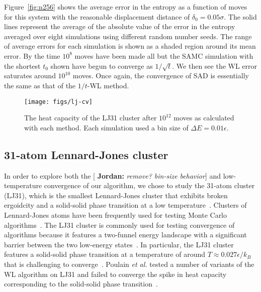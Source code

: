 \documentclass[letterpaper,twocolumn,amsmath,amssymb,pre,aps,10pt]{revtex4-1}
\newcommand{\blue}[1]{{\bf \color{blue} #1}}
\newcommand{\jpsays}[1]{{\color{red} [\blue{Jordan:} \emph{#1}]}}
\begin{document}
Figure~\ref{fig:n256} shows the average error in the entropy as a
function of moves for this system with the reasonable displacement
distance of $\delta_0 = 0.05\sigma$.  The solid lines represent the
average of the absolute value of the error in the entropy averaged
over eight simulations using different random number seeds.  The range
of average errors for each simulation is shown as a shaded region
around its mean error.  By the time $10^8$ moves have been made all
but the SAMC simulation with the shortest $t_0$ shown have begun to
converge as $1/\sqrt{t}$.  We then see the WL error saturates around
$10^{10}$ moves.  Once again, the convergence of SAD is essentially
the same as that of the $1/t$-WL method.

\begin{figure}
  \texttt{[image: figs/lj-cv]}
  \caption{The heat capacity of the LJ31 cluster after $10^{12}$ moves
    as calculated with each method.  Each simulation used a bin size
    of $\Delta E=0.01\epsilon$.}
  \label{fig:lj-cv}
\end{figure}

\subsection{31-atom Lennard-Jones cluster}

In order to explore both the \jpsays{remove? bin-size behavior} and low-temperature
convergence of our algorithm, we chose to study the 31-atom cluster
(LJ31), which is the smallest Lennard-Jones cluster that exhibits
broken ergoidcity and a solid-solid phase transition at a low
temperature~\cite{doye1998thermodynamics,
  martiniani2014superposition}.  Clusters of Lennard-Jones atoms have
been frequently used for testing Monte Carlo
algorithms~\cite{wales1997global, neirotti2000phase,
  frantsuzov2005size, mandelshtam2006multiple}.  The LJ31 cluster
is commonly used for testing convergence of algorithms
because it features a two-funnel energy landscape with a significant
barrier between the two low-energy states~\cite{calvo2000entropic,
  calvo2000phase, poulain2006performances,
  martiniani2014superposition}.  In particular, the LJ31 cluster
features a solid-solid phase transition at a temperature of around $T
\approx 0.027\epsilon/k_B$ that is challenging to
converge~\cite{mandelshtam2006multiple}.  Poulain \emph{et al.}
tested a number of variants of the WL algorithm on LJ31 and failed to
converge the spike in heat capacity corresponding to the solid-solid
phase transition~\cite{poulain2006performances}.
\end{document}
